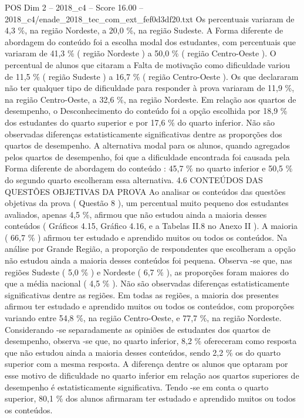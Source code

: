 \begin{textsample}{POS Dim 2 – 2018\_c4 – Score 16.00 – 2018\_c4/enade\_2018\_tec\_com\_ext\_fef0d3df20.txt}
Os percentuais variaram de 4,3 \%, na região Nordeste, a 20,0 \%, na região Sudeste.
A Forma diferente de abordagem do conteúdo foi a escolha modal dos estudantes, com percentuais que variaram de 41,3 \% ( região Nordeste ) a 50,0 \% ( região Centro-Oeste ).
O percentual de alunos que citaram a Falta de motivação como dificuldade variou de 11,5 \% ( região Sudeste ) a 16,7 \% ( região Centro-Oeste ).
Os que declararam não ter qualquer tipo de dificuldade para responder à prova variaram de 11,9 \%, na região Centro-Oeste, a 32,6 \%, na região Nordeste.
Em relação aos quartos de desempenho, o Desconhecimento do conteúdo foi a opção escolhida por 18,9 \% dos estudantes do quarto superior e por 17,6 \% do quarto inferior.
Não são observadas diferenças estatisticamente significativas dentre as proporções dos quartos de desempenho.
A alternativa modal para os alunos, quando agregados pelos quartos de desempenho, foi que a dificuldade encontrada foi causada pela Forma diferente de abordagem do conteúdo : 45,7 \% no quarto inferior e 50,5 \% do segundo quarto escolheram essa alternativa. 4.6 CONTEÚDOS DAS QUESTÕES OBJETIVAS DA PROVA Ao analisar os conteúdos das questões objetivas da prova ( Questão 8 ), um percentual muito pequeno dos estudantes avaliados, apenas 4,5 \%, afirmou que não estudou ainda a maioria desses conteúdos ( Gráficos 4.15, Gráfico 4.16, e a Tabelas II.8 no Anexo II ).
A maioria ( 66,7 \% ) afirmou ter estudado e aprendido muitos ou todos os conteúdos.
Na análise por Grande Região, a proporção de respondentes que escolheram a opção não estudou ainda a maioria desses conteúdos foi pequena.
Observa -se que, nas regiões Sudeste ( 5,0 \% ) e Nordeste ( 6,7 \% ), as proporções foram maiores do que a média nacional ( 4,5 \% ).
Não são observadas diferenças estatisticamente significativas dentre as regiões.
Em todas as regiões, a maioria dos presentes afirmou ter estudado e aprendido muitos ou todos os conteúdos, com proporções variando entre 54,8 \%, na região Centro-Oeste, e 77,7 \%, na região Nordeste.
Considerando -se separadamente as opiniões de estudantes dos quartos de desempenho, observa -se que, no quarto inferior, 8,2 \% ofereceram como resposta que não estudou ainda a maioria desses conteúdos, sendo 2,2 \% os do quarto superior com a mesma resposta.
A diferença dentre os alunos que optaram por esse motivo de dificuldade no quarto inferior em relação aos quartos superiores de desempenho é estatisticamente significativa.
Tendo -se em conta o quarto superior, 80,1 \% dos alunos afirmaram ter estudado e aprendido muitos ou todos os conteúdos.

\end{textsample}
